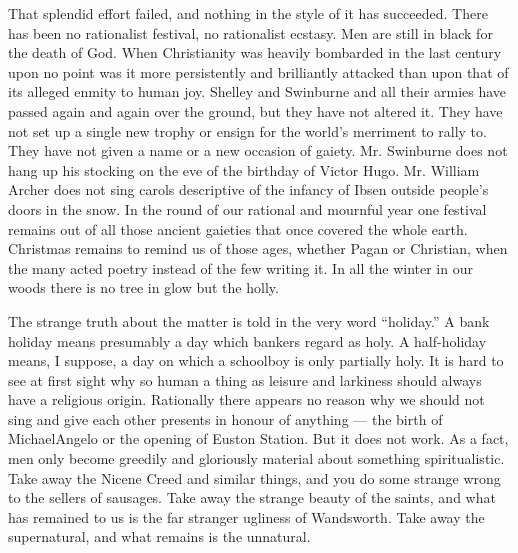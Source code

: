 That splendid effort failed, and nothing in the style of it has succeeded. There has been no rationalist festival, no rationalist ecstasy. Men are still in black for the death of God. When Christianity was heavily bombarded in the last century upon no point was it more persistently and brilliantly attacked than upon that of its alleged enmity to human joy. Shelley and Swinburne and all their armies have passed again and again over the ground, but they have not altered it. They have not set up a single new trophy or ensign for the world’s merriment to rally to. They have not given a name or a new occasion of gaiety. Mr. Swinburne does not hang up his stocking on the eve of the birthday of Victor Hugo. Mr. William Archer does not sing carols descriptive of the infancy of Ibsen outside people’s doors in the snow. In the round of our rational and mournful year one festival remains out of all those ancient gaieties that once covered the whole earth. Christmas remains to remind us of those ages, whether Pagan or Christian, when the many acted poetry instead of the few writing it. In all the winter in our woods there is no tree in glow but the holly.

The strange truth about the matter is told in the very word “holiday.” A bank holiday means presumably a day which bankers regard as holy. A half-holiday means, I suppose, a day on which a schoolboy is only partially holy. It is hard to see at first sight why so human a thing as leisure and larkiness should always have a religious origin. Rationally there appears no reason why we should not sing and give each other presents in honour of anything — the birth of MichaelAngelo or the opening of Euston Station. But it does not work. As a fact, men only become greedily and gloriously material about something spiritualistic. Take away the Nicene Creed and similar things, and you do some strange wrong to the sellers of sausages. Take away the strange beauty of the saints, and what has remained to us is the far stranger ugliness of Wandsworth. Take away the supernatural, and what remains is the unnatural.

